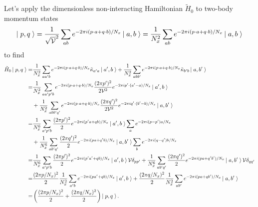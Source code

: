 Let's apply the dimensionless non-interacting Hamiltonian $\tilde{H}_0$ to two-body momentum states
\begin{equation}
    \left|\;p,q\;\right\rangle 
    =
    \frac{1}{\sqrt{\mathcal{V}}^2}\sum_{ab} e^{-2\pi i(p\cdot a + q \cdot b)/N_x} \left|\;a,b\;\right\rangle
    =
    \frac{1}{N_x^2}\sum_{ab} e^{-2\pi i(p\cdot a + q \cdot b)/N_x} \left|\;a,b\;\right\rangle
\end{equation}
to find
\begin{align}
    \tilde{H}_0 \left|\;p,q\;\right\rangle
    =&
			\frac{1}{N_x^2} \sum_{aa'b} e^{-2\pi i(p\cdot a + q \cdot b)/N_x} \tilde{\kappa}_{a'a}\left|\;a',b\;\right\rangle
		+   \frac{1}{N_x^2} \sum_{abb'} e^{-2\pi i(p\cdot a + q \cdot b)/N_x} \tilde{\kappa}_{b'b}\left|\;a,b'\;\right\rangle
    \nonumber\\
    =&
			\frac{1}{N_x^2} \sum_{aa'p'b} e^{-2\pi i(p\cdot a + q \cdot b)/N_x} \frac{(2\pi p')^2}{2\mathcal{V}^2} e^{-2\pi i p'\cdot(a'-a)/N_x}\left|\;a',b\;\right\rangle
			\nonumber\\&
		+   \frac{1}{N_x^2} \sum_{abb'q'} e^{-2\pi i(p\cdot a + q \cdot b)/N_x} \frac{(2\pi q')^2}{2\mathcal{V}^2} e^{-2\pi i q'\cdot(b'-b)/N_x}\left|\;a,b'\;\right\rangle
    \\
    =&
			\frac{1}{N_x^6} \sum_{a'p'b} \frac{(2\pi p')^2}{2} e^{-2\pi i(p'a+qb)/N_x} \left|\;a',b\;\right\rangle \sum_{a} e^{-2\pi i(p-p')a/N_x}
			\nonumber\\&
		+   \frac{1}{N_x^6} \sum_{ab'q'} \frac{(2\pi q')^2}{2} e^{-2\pi i(pa+q'b)/N_x} \left|\;a,b'\;\right\rangle \sum_{b} e^{-2\pi i(q-q')b/N_x}
    \\
    =&
			\frac{1}{N_x^6} \sum_{a'p'b} \frac{(2\pi p')^2}{2} e^{-2\pi i(p'a'+qb)/N_x} \left|\;a',b\;\right\rangle \mathcal{V} \delta_{pp'}
		+   \frac{1}{N_x^6} \sum_{ab'q'} \frac{(2\pi q')^2}{2} e^{-2\pi i(pa+q'b')/N_x} \left|\;a,b'\;\right\rangle \mathcal{V} \delta_{qq'}
    \\
    =&
			\frac{(2\pi p/N_x)^2}{2} \frac{1}{N_x^2}\sum_{a'b} e^{-2\pi i(pa'+qb)/N_x} \left|\;a',b\;\right\rangle
		+   \frac{(2\pi q/N_x)^2}{2} \frac{1}{N_x^2}\sum_{ab'} e^{-2\pi i(pa+qb')/N_x} \left|\;a,b'\;\right\rangle
    \\
    =&
		\left(\frac{(2\pi p/N_x)^2}{2} + \frac{(2\pi q/N_x)^2}{2}\right) \left|\;p,q\;\right\rangle.
\end{align}

